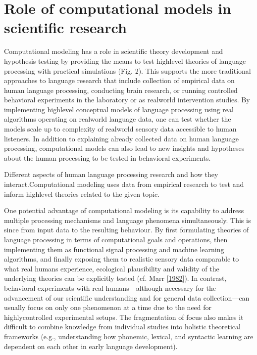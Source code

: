 \documentclass[letterpaper,10pt,english]{jupyterBook}
\begin{document}
\section{Role of computational models in scientific research}
\label{\detokenize{Computational_models_of_human_language_processing:role-of-computational-models-in-scientific-research}}
\sphinxAtStartPar
Computational modeling has a role in scientific theory development and
hypothesis testing by providing the means to test high\sphinxhyphen{}level theories of
language processing with practical simulations (Fig. 2). This supports
the more traditional approaches to language research that include
collection of empirical data on human language processing, conducting
brain research, or running controlled behavioral experiments in the
laboratory or as real\sphinxhyphen{}world intervention studies. By implementing
high\sphinxhyphen{}level conceptual models of language processing using real
algorithms operating on real\sphinxhyphen{}world language data, one can test whether
the models scale up to complexity of real\sphinxhyphen{}world sensory data accessible
to human listeners. In addition to explaining already collected data on
human language processing, computational models can also lead to new
insights and hypotheses about the human processing to be tested in
behavioral experiments.

\sphinxAtStartPar
{}
Different aspects of human language processing research and how they
interact.Computational modeling uses data from empirical research to test and
inform high\sphinxhyphen{}level theories related to the given topic.

\sphinxAtStartPar
One potential advantage of computational modeling is its capability to
address multiple processing mechanisms and language phenomena
simultaneously. This is since  from
input data to the resulting behaviour. By first formulating theories of
language processing in terms of computational goals and operations, then
implementing them as functional signal processing and machine learning
algorithms, and finally exposing them to realistic sensory data
comparable to what real humans experience, ecological plausibility and
validity of the underlying theories can be explicitly tested (cf. Marr {[}\hyperlink{cite.References:id28}{1982}{]}). In contrast, behavioral experiments with real humans—although
necessary for the advancement of our scientific understanding and for
general data collection—can usually focus on only one phenomenon at a
time due to the need for highly\sphinxhyphen{}controlled experimental setups. The
fragmentation of focus also makes it difficult to combine knowledge from
individual studies into holistic theoretical frameworks (e.g.,
understanding how phonemic, lexical, and syntactic learning are
dependent on each other in early language development).
\end{document}
